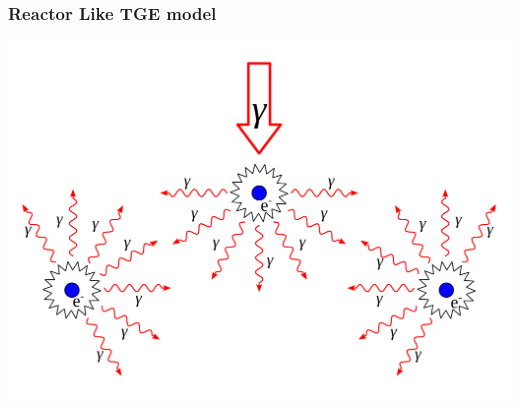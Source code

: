 \documentclass[8pt,pdf,hyperref={unicode}]{beamer}
\begin{document}
%
\begin{frame}
    \frametitle{Reactor Like TGE model}
 \centering\includegraphics[width=0.8\paperwidth]{draw.pdf}

\end{frame}
\usebackgroundtemplate{}
%
\end{document}

